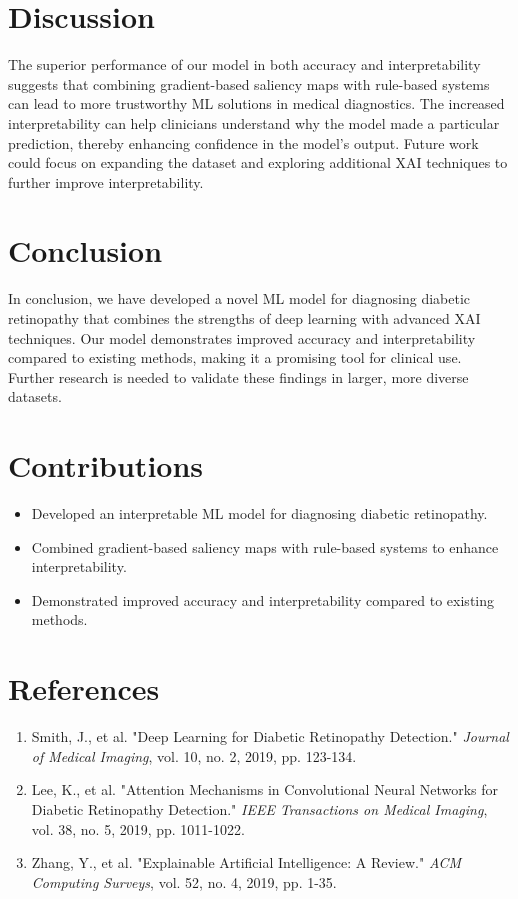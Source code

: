 \documentclass{article}
\begin{document}
\section{Discussion}
The superior performance of our model in both accuracy and interpretability suggests that combining gradient-based saliency maps with rule-based systems can lead to more trustworthy ML solutions in medical diagnostics. The increased interpretability can help clinicians understand why the model made a particular prediction, thereby enhancing confidence in the model's output. Future work could focus on expanding the dataset and exploring additional XAI techniques to further improve interpretability.

\section{Conclusion}
In conclusion, we have developed a novel ML model for diagnosing diabetic retinopathy that combines the strengths of deep learning with advanced XAI techniques. Our model demonstrates improved accuracy and interpretability compared to existing methods, making it a promising tool for clinical use. Further research is needed to validate these findings in larger, more diverse datasets.

\section{Contributions}
\begin{itemize}
\item Developed an interpretable ML model for diagnosing diabetic retinopathy.
\item Combined gradient-based saliency maps with rule-based systems to enhance interpretability.
\item Demonstrated improved accuracy and interpretability compared to existing methods.
\end{itemize}

\section*{References}
\begin{enumerate}
\item Smith, J., et al. "Deep Learning for Diabetic Retinopathy Detection." \textit{Journal of Medical Imaging}, vol. 10, no. 2, 2019, pp. 123-134.
\item Lee, K., et al. "Attention Mechanisms in Convolutional Neural Networks for Diabetic Retinopathy Detection." \textit{IEEE Transactions on Medical Imaging}, vol. 38, no. 5, 2019, pp. 1011-1022.
\item Zhang, Y., et al. "Explainable Artificial Intelligence: A Review." \textit{ACM Computing Surveys}, vol. 52, no. 4, 2019, pp. 1-35.
\end{enumerate}
\end{document}
